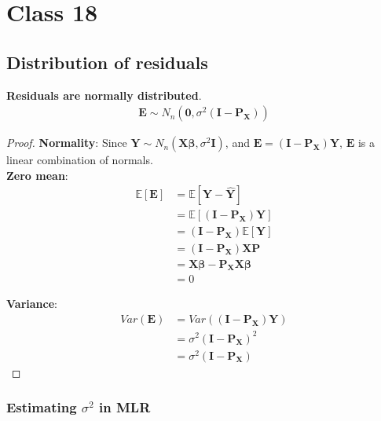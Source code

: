 \section{Class 18}

\subsection{Distribution of residuals}

\begin{result}
    \textbf{Residuals are normally distributed}. 
    \begin{align*}
        \bm{E} \sim N_n \left( \bm{0}, \sigma^2 \left( \bm{I} - \bm{P_X} \right)  \right) 
    \end{align*}
\end{result}

\begin{proof}
    \textbf{Normality}: Since $\bm{Y} \sim N_n \left( \bm{X \beta}, \sigma^2 \bm{I} \right) $, and $\bm{E} = (\bm{I} - \bm{P_X}) \bm{Y}$, $\bm{E}$ is a linear combination of normals.  \\

    \textbf{Zero mean}: 
    \begin{align*}
        \mathbb{E}\left[ \bm{E}\right]  &= \mathbb{E}\left[ \bm{Y} - \hat{ \bm{Y}}\right]  \\
        &= \mathbb{E}\left[ \left( \bm{I}- \bm{P_X} \right) \bm{Y} \right]  \\
        &= \left( \bm{I} - \bm{P_X} \right)  \mathbb{E}\left[ \bm{Y}\right]  \\
        &= \left( \bm{I} - \bm{P_X} \right) \bm{XP} \\
        &= \bm{X \beta} - \bm{P_X} \bm{X \beta} \\
        &= 0
    \end{align*}

    \textbf{Variance}: 
    \begin{align*}
        Var ( \bm{E}) &= Var \left( ( \bm{I} - \bm{P_X}) \bm{Y} \right)  \\
        &= \sigma^2 \left( \bm{I} - \bm{P_X} \right)^2 \\
        &= \sigma^2 \left( \bm{I} - \bm{P_X} \right) 
    \end{align*}
\end{proof}

\subsubsection{Estimating $\sigma^2$ in MLR} 


